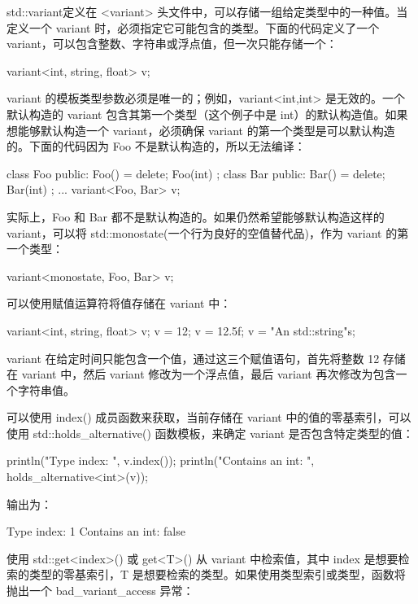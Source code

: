 std::variant定义在 <variant> 头文件中，可以存储一组给定类型中的一种值。当定义一个 variant 时，必须指定它可能包含的类型。下面的代码定义了一个 variant，可以包含整数、字符串或浮点值，但一次只能存储一个：

\begin{cpp}
variant<int, string, float> v;
\end{cpp}

variant 的模板类型参数必须是唯一的；例如，variant<int,int> 是无效的。一个默认构造的 variant 包含其第一个类型（这个例子中是 int）的默认构造值。如果想能够默认构造一个 variant，必须确保 variant 的第一个类型是可以默认构造的。下面的代码因为 Foo 不是默认构造的，所以无法编译：

\begin{cpp}
class Foo { public: Foo() = delete; Foo(int) {} };
class Bar { public: Bar() = delete; Bar(int) {} };
...
variant<Foo, Bar> v;
\end{cpp}

实际上，Foo 和 Bar 都不是默认构造的。如果仍然希望能够默认构造这样的 variant，可以将 std::monostate(一个行为良好的空值替代品)，作为 variant 的第一个类型：

\begin{cpp}
variant<monostate, Foo, Bar> v;
\end{cpp}

可以使用赋值运算符将值存储在 variant 中：

\begin{cpp}
variant<int, string, float> v;
v = 12;
v = 12.5f;
v = "An std::string"s;
\end{cpp}

variant 在给定时间只能包含一个值，通过这三个赋值语句，首先将整数 12 存储在 variant 中，然后 variant 修改为一个浮点值，最后 variant 再次修改为包含一个字符串值。

可以使用 index() 成员函数来获取，当前存储在 variant 中的值的零基索引，可以使用 std::holds\_alternative() 函数模板，来确定 variant 是否包含特定类型的值：

\begin{cpp}
println("Type index: {}", v.index());
println("Contains an int: {}", holds_alternative<int>(v));
\end{cpp}

输出为：

\begin{shell}
Type index: 1
Contains an int: false
\end{shell}

使用 std::get<index>() 或 get<T>() 从 variant 中检索值，其中 index 是想要检索的类型的零基索引，T 是想要检索的类型。如果使用类型索引或类型，函数将抛出一个 bad\_variant\_access 异常：

